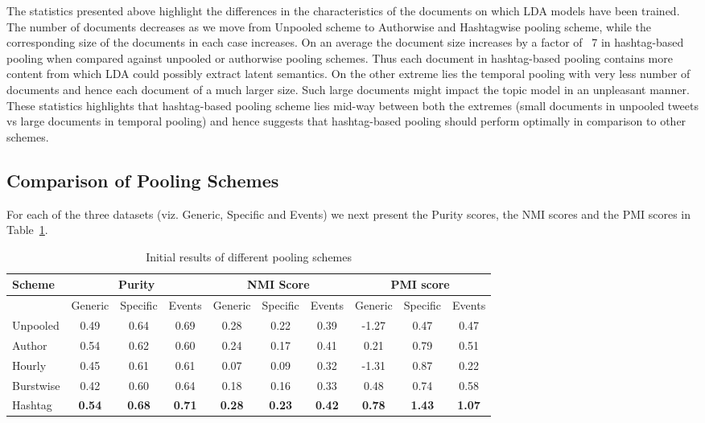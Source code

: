 \documentclass[10pt,a5paper,twoside]{article}
\begin{document}
The statistics presented above highlight the differences in the
characteristics of the documents on which LDA models have been
trained. The number of documents decreases as we move from Unpooled
scheme to Authorwise and Hashtagwise pooling scheme, while the
corresponding size of the documents in each case increases. On an
average the document size increases by a factor of ~7 in hashtag-based
pooling when compared against unpooled or authorwise pooling
schemes. Thus each document in hashtag-based pooling contains more
content from which LDA could possibly extract latent semantics. On the
other extreme lies the temporal pooling with very less number of
documents and hence each document of a much larger size. Such large
documents might impact the topic model in an unpleasant manner. These
statistics highlights that hashtag-based pooling scheme lies mid-way
between both the extremes (small documents in unpooled tweets vs large
documents in temporal pooling) and hence suggests that hashtag-based
pooling should perform optimally in comparison to other schemes.

\subsection{Comparison of Pooling Schemes}

For each of the three datasets (viz. Generic, Specific and Events) we
next present the Purity scores, the NMI scores and the PMI scores in
Table~\ref{tbl-456}.

\begin{table}[!h]
\centering
\resizebox{14cm}{!} 
{
	\begin{tabular}{|l|ccc|ccc|ccc|}
	\hline
	Scheme  & \multicolumn {3}{c|}{Purity} & \multicolumn {3}{c|}{NMI Score} & \multicolumn {3}{c|}{PMI score}\\
	\hline
	 & Generic & Specific & Events &  Generic & Specific & Events &  Generic & Specific & Events\\
	\hline
	Unpooled & 0.49 & 0.64 & 0.69 & 0.28 & 0.22 & 0.39 & -1.27 & 0.47 & 0.47 \\
	\hline
	Author & 0.54 & 0.62 & 0.60 & 0.24 & 0.17 & 0.41 & 0.21 & 0.79 & 0.51 \\
	\hline
	Hourly & 0.45 & 0.61 & 0.61 & 0.07 & 0.09 & 0.32 & -1.31 & 0.87 & 0.22 \\
	\hline
	Burstwise & 0.42 & 0.60 & 0.64 & 0.18 & 0.16 & 0.33 & 0.48 & 0.74 & 0.58 \\
	\hline
	Hashtag & \textbf{0.54} & \textbf{0.68} & \textbf{0.71} & \textbf{0.28} & \textbf{0.23} & \textbf{0.42} & \textbf{0.78} & \textbf{1.43} & \textbf{1.07} \\
	\hline
	\end{tabular}
}
\caption{Initial results of different pooling schemes}\label{tbl-456}
\end{table}
\end{document}
